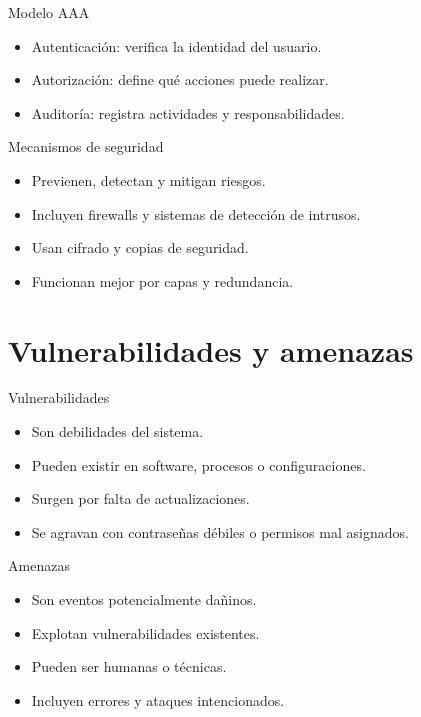 \documentclass{beamer}
\begin{document}
\begin{frame}{Modelo AAA}
\begin{itemize}
    \item Autenticación: verifica la identidad del usuario.
    \item Autorización: define qué acciones puede realizar.
    \item Auditoría: registra actividades y responsabilidades.
\end{itemize}
\end{frame}

\begin{frame}{Mecanismos de seguridad}
\begin{itemize}
    \item Previenen, detectan y mitigan riesgos.
    \item Incluyen firewalls y sistemas de detección de intrusos.
    \item Usan cifrado y copias de seguridad.
    \item Funcionan mejor por capas y redundancia.
\end{itemize}
\end{frame}


\section{Vulnerabilidades y amenazas}

\begin{frame}{Vulnerabilidades}
\begin{itemize}
    \item Son debilidades del sistema.
    \item Pueden existir en software, procesos o configuraciones.
    \item Surgen por falta de actualizaciones.
    \item Se agravan con contraseñas débiles o permisos mal asignados.
\end{itemize}
\end{frame}

\begin{frame}{Amenazas}
\begin{itemize}
    \item Son eventos potencialmente dañinos.
    \item Explotan vulnerabilidades existentes.
    \item Pueden ser humanas o técnicas.
    \item Incluyen errores y ataques intencionados.
\end{itemize}
\end{frame}
\end{document}
